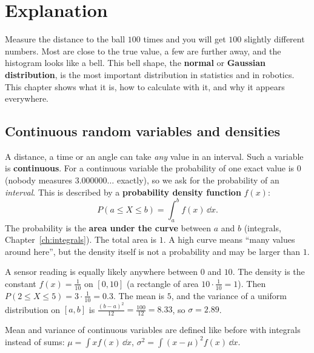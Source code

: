 \label{ch:normal}

\section*{Explanation}
Measure the distance to the ball $100$ times and you will get $100$ slightly different numbers. Most are close to the true value, a few are further away, and the histogram looks like a bell. This bell shape, the \textbf{normal} or \textbf{Gaussian distribution}, is the most important distribution in statistics and in robotics. This chapter shows what it is, how to calculate with it, and why it appears everywhere.

\subsection*{Continuous random variables and densities}
A distance, a time or an angle can take \emph{any} value in an interval. Such a variable is \textbf{continuous}. For a continuous variable the probability of one exact value is $0$ (nobody measures $3.000000\ldots$ exactly), so we ask for the probability of an \emph{interval}. This is described by a \textbf{probability density function} $f(x)$:
\[
P(a\le X\le b)=\int_a^b f(x)\,\dd x.
\]
The probability is the \textbf{area under the curve} between $a$ and $b$ (integrals, Chapter~\ref{ch:integrals}). The total area is $1$. A high curve means ``many values around here'', but the density itself is not a probability and may be larger than $1$.

\begin{example}
A sensor reading is equally likely anywhere between $0$ and $10$. The density is the constant $f(x)=\frac1{10}$ on $[0,10]$ (a rectangle of area $10\cdot\frac1{10}=1$). Then $P(2\le X\le5)=3\cdot\frac1{10}=0.3$. The mean is $5$, and the variance of a uniform distribution on $[a,b]$ is $\frac{(b-a)^2}{12}=\frac{100}{12}=8.33$, so $\sigma=2.89$.
\end{example}

Mean and variance of continuous variables are defined like before with integrals instead of sums: $\mu=\int x f(x)\,\dd x$, $\sigma^2=\int(x-\mu)^2f(x)\,\dd x$.

